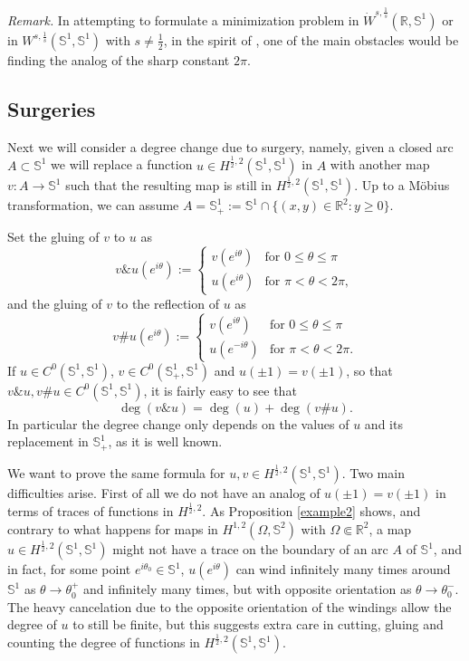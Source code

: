 \documentclass[12pt, a4paper]{article}
\newenvironment{rmk}{\medskip\noindent\emph{Remark.}}{\medskip}
\newcommand{\sph}{\mathbb{S}}
\newcommand{\R}{\mathbb{R}}
\renewcommand{\(}{\left(}
\renewcommand{\)}{\right)}
\begin{document}
\begin{rmk}
In attempting to formulate a minimization problem in $\dot W^{s,\frac{1}{s}}(\R,\sph^1)$ or in $W^{s,\frac{1}{s}}(\sph^1,\sph^1)$ with $s\ne \frac12$, in the spirit of \cite{MazSch, MazSch2}, one of the main obstacles would be finding the analog of the sharp constant $2\pi$.
\end{rmk}


\subsection{Surgeries}

Next we will consider a degree change due to surgery, namely, given a closed arc $A\subset \sph^1$ we will  replace a function $u\in H^{\frac{1}{2},2}(\sph^1,\sph^1)$ in $A$ with another map $v:A\to \sph^1$ such that the resulting map is still in $H^{\frac12,2}(\sph^1,\sph^1)$. Up to a M\"obius transformation, we can assume $A=\sph^1_+:=\sph^1\cap \{(x,y)\in \R^2:y\ge 0\}$.

 Set the gluing of $v$ to $u$ as
\begin{equation}\label{defw}
v\& u(e^{i\theta}):=
\begin{cases}
v(e^{i\theta}) &\text{for }0\le \theta\le \pi\\
u(e^{i\theta}) &\text{for } \pi <\theta< 2\pi,
\end{cases}
\end{equation}
and the gluing of $v$ to the reflection of $u$ as
\begin{equation}\label{defuv}
v\# u(e^{i\theta}):=
\begin{cases}
v(e^{i\theta}) &\text{for }0\le \theta\le \pi\\
u(e^{-i\theta}) &\text{for } \pi <\theta< 2\pi.
\end{cases}
\end{equation}
If $u\in C^0(\sph^1,\sph^1)$, $v\in C^0(\sph^1_+,\sph^1)$ and $u(\pm1)=v(\pm1)$, so that $v\&u, v\# u\in C^0(\sph^1,\sph^1)$, it is fairly easy to see that 
$$\deg(v\& u)= \deg(u)+\deg (v\#u).$$
In particular the degree change only depends on the values of $u$ and its replacement in $\sph^1_+$, as it is well known.

We want to prove the same formula for $u,v\in H^{\frac12,2}(\sph^1,\sph^1)$. Two main difficulties arise. First of all we do not have an analog of $u(\pm1)=v(\pm1)$ in terms of traces of functions in $H^{\frac12,2}$. As Proposition \ref{example2} shows, and contrary to what happens for maps in $H^{1,2}(\Omega,\sph^2)$ with $\Omega\Subset \R^2$, a map $u\in H^{\frac12,2}(\sph^1,\sph^1)$ might not have a trace on the boundary of an arc $A$ of $\sph^1$, and in fact, for some point $e^{i\theta_0}\in \sph^1$, $u(e^{i\theta})$  can wind infinitely many times around $\sph^1$ as $\theta\to \theta_0^+$ and infinitely many times, but with opposite orientation as $\theta\to \theta_0^-$. The heavy cancelation due to the opposite orientation of the windings allow the degree of $u$ to still be finite, but this suggests extra care in cutting, gluing and counting the degree of functions in $H^{\frac12,2}(\sph^1,\sph^1)$.
\end{document}
